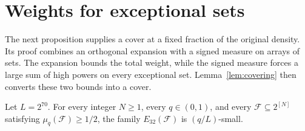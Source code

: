 \section{Weights for exceptional sets}
\label{sec:weights}

The next proposition supplies a cover at a fixed fraction of the original
density. Its proof combines an orthogonal expansion with a signed measure
on arrays of sets. The expansion bounds the total weight, while the signed
measure forces a large sum of high powers on every exceptional set.
Lemma~\ref{lem:covering} then converts these two bounds into a cover.

\begin{proposition}\label{prop:half-density}
Let $L=2^{70}$. For every integer $N\ge1$, every $q\in(0,1)$, and every
$\mathcal F\subseteq 2^{[N]}$ satisfying $\mu_q(\mathcal F)\ge1/2$,
the family $E_{32}(\mathcal F)$ is $(q/L)$-small.
\end{proposition}

